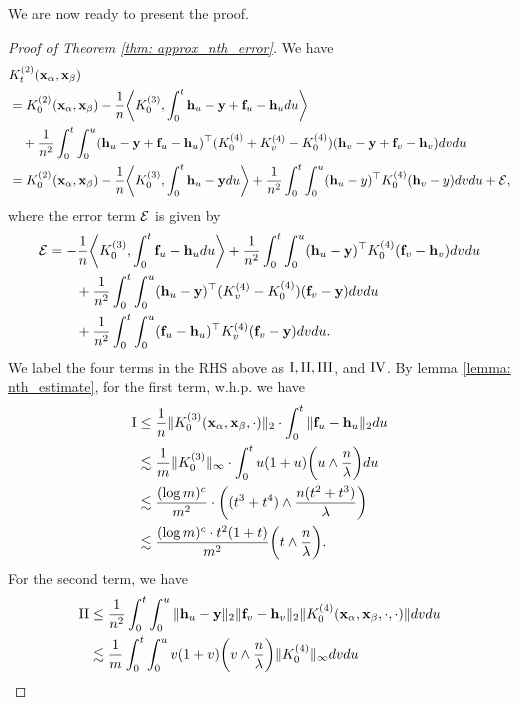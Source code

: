 We are now ready to present the proof.
\begin{proof}[Proof of Theorem \ref{thm: approx_nth_error}]
	We have
	\begin{align*}
	& {K}^{(2)}_t({\mathbf{x}}_\alpha, {\mathbf{x}}_\beta)\\
	& = {K}^{(2)}_0({\mathbf{x}}_\alpha, {\mathbf{x}}_\beta) - \frac{1}{n} \bigg\langle {K}^{(3)}_0,\int_0^t {\mathbf{h}}_u - {\mathbf{y}} + {\mathbf{f}}_u - {\mathbf{h}}_u du  \bigg\rangle \\
	& \ \ \ + \frac{1}{n^2} \int_0^t \int_0^u ({\mathbf{h}}_u - {\mathbf{y}} + {\mathbf{f}}_u - {\mathbf{h}}_u)^\top ({K}^{(4)}_0 + {K}^{(4)}_v - {K}^{(4)}_0) ({\mathbf{h}}_v - {\mathbf{y}} + {\mathbf{f}}_v - {\mathbf{h}}_v) dvdu\\
	& = {K}^{(2)}_0({\mathbf{x}}_\alpha, {\mathbf{x}}_\beta) - \frac{1}{n}  \bigg\langle {K}^{(3)}_0,\int_0^t {\mathbf{h}}_u - {\mathbf{y}} du \bigg\rangle  + \frac{1}{n^2}  \int_0^t\int_0^u ({\mathbf{h}}_u - y)^\top {K}^{(4)}_0({\mathbf{h}}_v-y) dvdu + {\mathcal{E}},
	\end{align*}
	where the error term ${\mathcal{E}}$ is given by
	\begin{align*}
		{\mathcal{E}} & = - \frac{1}{n}  \bigg\langle {K}^{(3)}_0,\int_0^t {\mathbf{f}}_u - {\mathbf{h}}_u du  \bigg\rangle + \frac{1}{n^2}\int_0^t\int_0^u ({\mathbf{h}}_u-{\mathbf{y}})^\top {K}^{(4)}_0({\mathbf{f}}_v - {\mathbf{h}}_v) dvdu\\
	& \qquad  + \frac{1}{n^2} \int_0^t\int_0^u ({\mathbf{h}}_u-{\mathbf{y}})^\top ({K}^{(4)}_v - {K}^{(4)}_0)({\mathbf{f}}_v - {\mathbf{y}}) dvdu \\
	& \qquad + \frac{1}{n^2} \int_0^t\int_0^u ({\mathbf{f}}_u - {\mathbf{h}}_u)^\top {K}^{(4)}_v({\mathbf{f}}_v - {\mathbf{y}}) dvdu.
	\end{align*}
	We label the four terms in the RHS above as $\RN{1}, \RN{2}, \RN{3}$, and $\RN{4}$. By lemma \ref{lemma: nth_estimate}, for the first term, w.h.p. we have
	\begin{align*}
		\RN{1} & \leq \frac{1}{n} \| \KKK_0(\rvx_\alpha,\rvx_\beta, \cdot)\|_2 \cdot \int_0^t  \| \rvf_u-\rvh_u\|_2 du \\ 
		& \lesssim \frac{1}{{m}} \| \KKK_0\|_\infty \cdot \int_0^t u(1+u) \bigg(u\land \frac{n}{\lambda}\bigg) du\\
		& \lesssim \frac{(\log m)^c}{m^2} \cdot \bigg((t^3 + t^4) \land  \frac{n (t^2 + t^3)}{\lambda}\bigg)\\
		& \lesssim \frac{(\log m)^c \cdot t^2(1+t)}{m^2} \bigg(t \land \frac{n}{\lambda}\bigg).
	\end{align*}
	For the second term, we have
	\begin{align*}
		\RN{2} & \leq \frac{1}{n^2} \int_0^t \int_0^u \| \rvh_u - \rvy\|_2 \| \rvf_v -\rvh_v\|_2 \| \KKKK_0(\rvx_\alpha, \rvx_\beta, \cdot, \cdot)\| dvdu\\
		& \lesssim\frac{1}{m} \int_0^t \int_0^u v(1+v) \bigg(v \land \frac{n}{\lambda}\bigg) \| \KKKK_0\|_\infty dvdu\\

\end{align*}
\end{proof}

